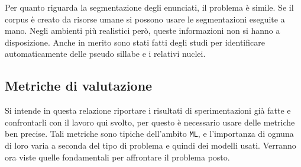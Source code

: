 \documentclass[twoside,twocolumn,11pt]{extarticle}
\theoremstyle{definition}
\begin{document}
	Per quanto riguarda la segmentazione degli enunciati, il problema è simile. Se il corpus è creato da risorse umane si possono usare le segmentazioni eseguite a mano. Negli ambienti più realistici però, queste informazioni non si hanno a disposizione. Anche in merito sono stati fatti degli studi per identificare automaticamente delle pseudo sillabe e i relativi nuclei.
	
	\subsection{Metriche di valutazione}
		Si intende in questa relazione riportare i risultati di sperimentazioni già fatte e confrontarli con il lavoro qui svolto, per questo è necessario usare delle metriche ben precise. Tali metriche sono tipiche dell'ambito \texttt{ML}, e l'importanza di ognuna di loro varia a seconda del tipo di problema e quindi dei modelli usati. Verranno ora viste quelle fondamentali per affrontare il problema posto.
		
\end{document}
